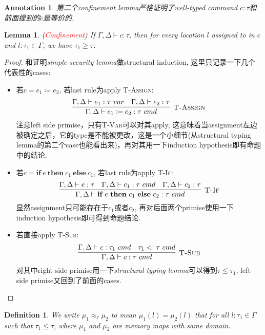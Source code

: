 \documentclass{article}
\newtheorem{lemma}[theorem]{Lemma}
\newtheorem{definition}[theorem]{Definition}
\newtheorem{annotation}[theorem]{Annotation}
\newcommand{\redt}[1]{\textcolor{red}{#1}}
\newcommand{\termtype}[2]{\ensuremath{#1:#2}}
\newcommand{\ifelse}[3]{\ensuremath{\textbf{if}~#1~\textbf{then}~#2~\textbf{else}~#3}}
\begin{document}
\begin{annotation}
\rm 第二个\emph{confinement lemma}严格证明了well-typed command $\termtype{c}{\tau}$和前面提到的$\overline{c}$是等价的. 
\end{annotation}

\begin{lemma}
\rm (\redt{Confinement}) If $\Gamma,\Delta \vdash \termtype{c}{\tau}$, then for every location $l$ assigned to in $c$ and $\termtype{l}{\tau_1} \in \Gamma$, we have $\tau_1 \geq \tau$.
\end{lemma}

\begin{proof}
\rm 和证明\emph{simple security lemma}做structural induction, 这里只记录一下几个代表性的cases:
\begin{itemize}
	\item 若$c = e_1 \coloneqq e_2$, 若last rule为apply \textsc{T-Assign}:
	\[
		\infer[\textsc{T-Assign}]{\Gamma, \Delta \vdash \termtype{e_1 \coloneqq e_2}{\tau~cmd}}{\Gamma, \Delta \vdash \termtype{e_1}{\tau~var} & \Gamma, \Delta \vdash \termtype{e_2}{\tau}}
	\]
	注意left side primise，只有\textsc{T-Var}可以对其apply, 这意味着当assignment左边被确定之后，它的type是不能被更改，这是一个小细节(从structural typing lemma的第二个case也能看出来)，再对其用一下induction hypothesis即有命题中的结论. 	
	\item 若$c = \ifelse{e}{c_1}{c_1}$, 若last rule为apply \textsc{T-If}:
\[
	\infer[\textsc{T-If}]{\Gamma, \Delta \vdash \termtype{\ifelse{e}{c_1}{c_2}}{\tau~cmd}}{\Gamma, \Delta \vdash \termtype{e}{\tau} & \Gamma, \Delta \vdash \termtype{c_1}{\tau~cmd} & \Gamma, \Delta \vdash \termtype{c_2}{\tau}}
\]
	显然assignment只可能存在于$c_1$或者$c_2$, 再对后面两个primise使用一下induction hypothesis即可得到命题结论.
	\item 若直接apply \textsc{T-Sub}:
	\[
		\infer[\textsc{T-Sub}]{\Gamma, \Delta \vdash \termtype{c}{\tau~cmd}}{\Gamma, \Delta \vdash \termtype{c}{\tau_1~cmd} & \tau_1 <: \tau~cmd}
	\]
	对其中right side primise用一下\emph{structural typing lemma}可以得到$\tau \leq \tau_1$, left side primise又回到了前面的cases. 
\end{itemize}
\end{proof}

\begin{definition}
\rm We write $\mu_1 \approx_\tau \mu_2$ to mean $\mu_1(l) = \mu_2(l)$ that for all $\termtype{l}{\tau_1} \in \Gamma$ such that $\tau_1 \leq \tau$, where $\mu_1$ and $\mu_2$ are memory maps with same domain. 
\end{definition}
\end{document}
